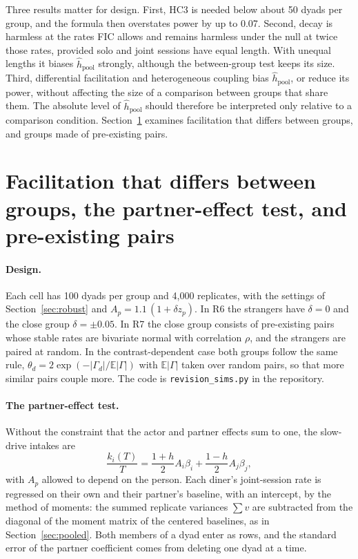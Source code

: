 \documentclass[12pt]{article}
\theoremstyle{definition}
\newcommand{\ki}{k_i}
\begin{document}
Three results matter for design. First, HC3 is needed below about 50 dyads per
group, and the formula then overstates power by up to 0.07. Second, decay is
harmless at the rates FIC allows and remains harmless under the null at twice
those rates, provided solo and joint sessions have equal length. With unequal
lengths it biases $\hat h_{\mathrm{pool}}$ strongly, although the between-group test
keeps its size. Third, differential facilitation and heterogeneous coupling bias
$\hat h_{\mathrm{pool}}$, or reduce its power, without affecting the size of a
comparison between groups that share them. The absolute level of
$\hat h_{\mathrm{pool}}$ should therefore be interpreted only relative to a
comparison condition. Section~\ref{sec:facil} examines facilitation that differs
between groups, and groups made of pre-existing pairs.


\section{Facilitation that differs between groups, the partner-effect test, and pre-existing pairs}\label{sec:facil}

\paragraph{Design.} Each cell has 100 dyads per group and 4{,}000 replicates, with the
settings of Section~\ref{sec:robust} and $A_p=1.1\,(1+\delta z_p)$. In R6 the
strangers have $\delta=0$ and the close group $\delta=\pm0.05$. In R7 the close group
consists of pre-existing pairs whose stable rates are bivariate normal with
correlation $\rho$, and the strangers are paired at random. In the
contrast-dependent case both groups follow the same rule,
$\theta_d=2\exp(-|\Gamma_d|/\mathbb{E}|\Gamma|)$ with $\mathbb{E}|\Gamma|$ taken over
random pairs, so that more similar pairs couple more. The code is
\texttt{revision\_sims.py} in the repository.

\paragraph{The partner-effect test.} Without the constraint that the actor and
partner effects sum to one, the slow-drive intakes are
\begin{equation}\label{eq:apimfree}
\frac{\ki(T)}{T}=\frac{1+h}{2}A_i\beta_i+\frac{1-h}{2}A_j\beta_j ,
\end{equation}
with $A_p$ allowed to depend on the person. Each diner's joint-session rate is
regressed on their own and their partner's baseline, with an intercept, by the
method of moments: the summed replicate variances $\sum v$ are subtracted from the
diagonal of the moment matrix of the centered baselines, as in
Section~\ref{sec:pooled}. Both members of a dyad enter as rows, and the standard
error of the partner coefficient comes from deleting one dyad at a time.
\end{document}
